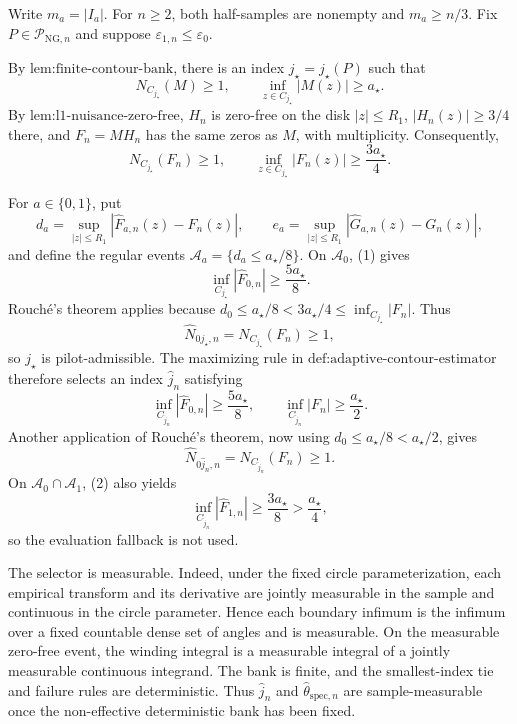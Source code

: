 Write \(m_a=|I_a|\).  For \(n\ge2\), both half-samples are nonempty and \(m_a\ge n/3\).  Fix \(P\in\mathcal P_{\mathrm{NG},n}\) and suppose \(\varepsilon_{1,n}\le\varepsilon_0\).

By \(\text{lem:finite-contour-bank}\), there is an index \(j_{\star}=j_{\star}(P)\) such that
\[
 N_{C_{j_{\star}}}(M)\ge1,
 \qquad
 \inf_{z\in C_{j_{\star}}}|M(z)|\ge a_{\star}.
\]
By \(\text{lem:l1-nuisance-zero-free}\), \(H_n\) is zero-free on the disk \(|z|\le R_1\), \(|H_n(z)|\ge3/4\) there, and \(F_n=M H_n\) has the same zeros as \(M\), with multiplicity.  Consequently,
\[
 N_{C_{j_{\star}}}(F_n)\ge1,
 \qquad
 \inf_{z\in C_{j_{\star}}}|F_n(z)|\ge\frac{3a_{\star}}4. \tag{1}
\]

For \(a\in\{0,1\}\), put
\[
 d_a=\sup_{|z|\le R_1}|\widehat F_{a,n}(z)-F_n(z)|,
 \qquad
 e_a=\sup_{|z|\le R_1}|\widehat G_{a,n}(z)-G_n(z)|,
\]
and define the regular events \(\mathcal A_a=\{d_a\le a_{\star}/8\}\).  On \(\mathcal A_0\), (1) gives
\[
 \inf_{C_{j_{\star}}}|\widehat F_{0,n}|
 \ge\frac{5a_{\star}}8.
\]
Rouch\'e's theorem applies because \(d_0\le a_{\star}/8<3a_{\star}/4\le\inf_{C_{j_{\star}}}|F_n|\).  Thus
\[
 \widehat N_{0j_{\star},n}=N_{C_{j_{\star}}}(F_n)\ge1,
\]
so \(j_{\star}\) is pilot-admissible.  The maximizing rule in \(\text{def:adaptive-contour-estimator}\) therefore selects an index \(\widehat j_n\) satisfying
\[
 \inf_{C_{\widehat j_n}}|\widehat F_{0,n}|
 \ge\frac{5a_{\star}}8,
 \qquad
 \inf_{C_{\widehat j_n}}|F_n|
 \ge\frac{a_{\star}}2. \tag{2}
\]
Another application of Rouch\'e's theorem, now using \(d_0\le a_{\star}/8<a_{\star}/2\), gives
\[
 \widehat N_{0\widehat j_n,n}=N_{C_{\widehat j_n}}(F_n)\ge1. \tag{3}
\]
On \(\mathcal A_0\cap\mathcal A_1\), (2) also yields
\[
 \inf_{C_{\widehat j_n}}|\widehat F_{1,n}|
 \ge\frac{3a_{\star}}8>\frac{a_{\star}}4, \tag{4}
\]
so the evaluation fallback is not used.

The selector is measurable.  Indeed, under the fixed circle parameterization, each empirical transform and its derivative are jointly measurable in the sample and continuous in the circle parameter.  Hence each boundary infimum is the infimum over a fixed countable dense set of angles and is measurable.  On the measurable zero-free event, the winding integral is a measurable integral of a jointly measurable continuous integrand.  The bank is finite, and the smallest-index tie and failure rules are deterministic.  Thus \(\widehat j_n\) and \(\widehat\theta_{\mathrm{spec},n}\) are sample-measurable once the non-effective deterministic bank has been fixed.

